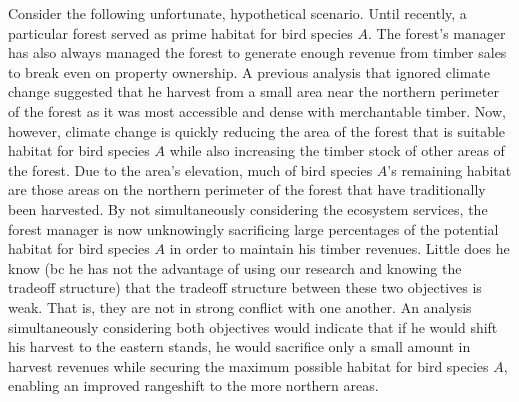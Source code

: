 Consider the following unfortunate, hypothetical scenario. Until recently, a particular forest served as prime habitat for bird species $A$. The forest's manager has also always managed the forest to generate enough revenue from timber sales to break even on property ownership.  A previous analysis that ignored climate change suggested that he harvest from a small area near the northern perimeter of the forest as it was most accessible and dense with merchantable timber. Now, however, climate change is quickly reducing the area of the forest that is suitable habitat for bird species $A$ while also increasing the timber stock of other areas of the forest. Due to the area's elevation, much of bird species $A$'s remaining habitat are those areas on the northern perimeter of the forest that have traditionally been harvested. By not simultaneously considering the ecosystem services, the forest manager is now unknowingly sacrificing large percentages of the potential habitat for bird species $A$ in order to maintain his timber revenues. Little does he know (bc he has not the advantage of using our research and knowing the tradeoff structure) that the tradeoff structure between these two objectives is weak. That is, they are not in strong conflict with one another. An analysis simultaneously considering both objectives would indicate that if he would shift his harvest to the eastern stands, he would sacrifice only a small amount in harvest revenues while securing the maximum possible habitat for bird species $A$, enabling an improved rangeshift to the more northern areas.

